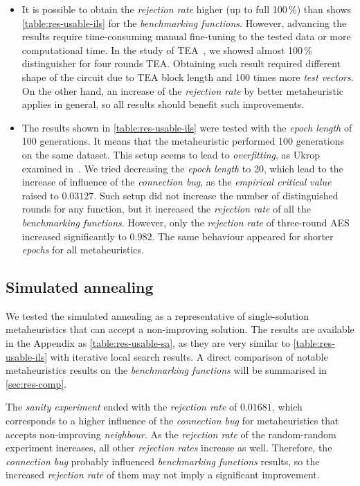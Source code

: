 \documentclass[
    digital,    %
    oneside,    %
    color,
    11pt,
    nocover,
    notable,
    nolof,
    nolot,
]{fithesis3}
\begin{document}
\begin{itemize}
    \item It is possible to obtain the \textit{rejection rate} higher (up to full 100\,\%) than shows \cref{table:res-usable-ils} for the \textit{benchmarking functions}. However, advancing the results require time-consuming manual fine-tuning to the tested data or more computational time. In the study of TEA~\cite{kubicek2016new}, we showed almost 100\,\% distinguisher for four rounds TEA. Obtaining such result required different shape of the circuit due to TEA block length and 100 times more \textit{test vectors}. On the other hand, an increase of the \textit{rejection rate} by better metaheuristic applies in general, so all results should benefit such improvements.
    
    \item The results shown in \cref{table:res-usable-ils} were tested with the \textit{epoch length} of 100 generations. It means that the metaheuristic performed 100 generations on the same dataset. This setup seems to lead to \textit{overfitting}, as Ukrop examined in~\cite[Section~7.1]{ukropBcThesis}. We tried decreasing the \textit{epoch length} to 20, which lead to the increase of influence of the \textit{connection bug}, as the \textit{empirical critical value} raised to $0.03127$. Such setup did not increase the number of distinguished rounds for any function, but it increased the \textit{rejection rate} of all the \textit{benchmarking functions}. However, only the \textit{rejection rate} of three-round AES increased significantly to $0.982$. The same behaviour appeared for shorter \textit{epochs} for all metaheuristics.
\end{itemize}

\subsection{Simulated annealing}
\label{subsec:res-ss-sa}

We tested the simulated annealing as a representative of single-solution metaheuristics that can accept a non-improving solution. The results are available in the Appendix as \cref{table:res-usable-sa}, as they are very similar to \cref{table:res-usable-ils} with iterative local search results. A direct comparison of notable metaheuristics results on the \textit{benchmarking functions} will be summarised in \cref{sec:res-comp}.

The \textit{sanity experiment} ended with the \textit{rejection rate} of $0.01681$, which corresponds to a higher influence of the \textit{connection bug} for metaheuristics that accepts non-improving \textit{neighbour}. As the \textit{rejection rate} of the random-random experiment increases, all other \textit{rejection rates} increase as well. Therefore, the \textit{connection bug} probably influenced \textit{benchmarking functions} results, so the increased \textit{rejection rate} of them may not imply a significant improvement.
\end{document}
